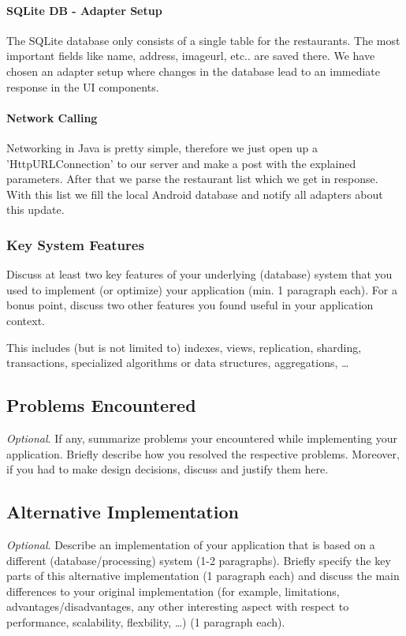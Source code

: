 \paragraph{SQLite DB - Adapter Setup}
The SQLite database only consists of a single table for the restaurants. The most important fields like name, address, imageurl, etc.. are saved there. We have chosen an adapter setup where changes in the database lead to an immediate response in the UI components.
\paragraph{Network Calling}
Networking in Java is pretty simple, therefore we just open up a 'HttpURLConnection' to our server and make a post with the explained parameters. After that we parse the restaurant list which we get in response. With this list we fill the local Android database and notify all adapters about this update. 

\subsubsection{Key System Features}

Discuss at least two key features of your underlying (database) system that you
used to implement (or optimize) your application (min. 1 paragraph each). For
a bonus point, discuss two other features you found useful in your application
context.

This includes (but is not limited to) indexes, views, replication, sharding,
transactions, specialized algorithms or data structures, aggregations, \ldots

\subsection{Problems Encountered}

\emph{Optional}. If any, summarize problems your encountered while implementing
your application. Briefly describe how you resolved the respective problems.
Moreover, if you had to make design decisions, discuss and justify them here.

\subsection{Alternative Implementation}

\emph{Optional}. Describe an implementation of your application that is based on
a different (database/processing) system (1-2 paragraphs). Briefly specify the
key parts of this alternative implementation (1 paragraph each) and discuss the
main differences to your original implementation (for example, limitations,
advantages/disadvantages, any other interesting aspect with respect to
performance, scalability, flexbility, \ldots) (1 paragraph each).
